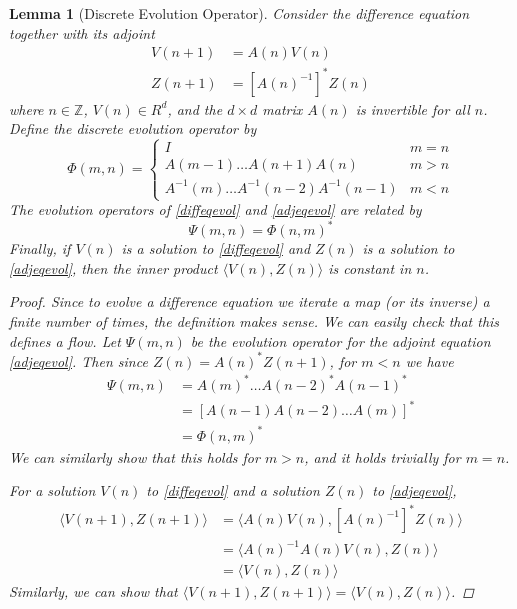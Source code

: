 \documentclass[12pt]{article}
\def\Z{{\mathbb Z}}
\newtheorem{lemma}{Lemma}
\begin{document}
\begin{lemma}[Discrete Evolution Operator]\label{evolop}
Consider the difference equation together with its adjoint
\begin{align}
V(n+1) &= A(n) V(n) \label{diffeqevol} \\
Z(n+1) &= [A(n)^{-1}]^* Z(n) \label{adjeqevol}
\end{align}
where $n \in \Z$, $V(n) \in R^d$, and the $d \times d$ matrix $A(n)$ is invertible for all $n$. Define the discrete evolution operator by
\begin{equation}\label{evol}
\Phi(m, n) = 
\begin{cases}
I & m = n \\
A(m-1) \dots A(n+1) A(n) & m > n \\
A^{-1}(m) \dots A^{-1}(n-2) A^{-1}(n-1) & m < n
\end{cases}
\end{equation}
The evolution operators of \eqref{diffeqevol} and \eqref{adjeqevol} are related by
\begin{equation}\label{adjevol}
\Psi(m, n) = \Phi(n, m)^*
\end{equation}
Finally, if $V(n)$ is a solution to \eqref{diffeqevol} and $Z(n)$ is a solution to \eqref{adjeqevol}, then the inner product $\langle V(n), Z(n) \rangle$ is constant in $n$.

\begin{proof}
Since to evolve a difference equation we iterate a map (or its inverse) a finite number of times, the definition makes sense. We can easily check that this defines a flow. Let $\Psi(m, n)$ be the evolution operator for the adjoint equation \eqref{adjeqevol}. Then since $Z(n) = A(n)^* Z(n+1)$, for $m < n$ we have
\begin{align*}
\Psi(m, n) &= A(m)^* \dots A(n-2)^* A(n-1)^* \\
&= [A(n-1) A(n-2) \dots A(m)]^* \\
&= \Phi(n, m)^*
\end{align*}
We can similarly show that this holds for $m > n$, and it holds trivially for $m = n$.

For a solution $V(n)$ to \eqref{diffeqevol} and a solution $Z(n)$ to \eqref{adjeqevol},
\begin{align*}
\langle V(n+1), Z(n+1) \rangle &= 
\langle A(n) V(n), [A(n)^{-1}]^* Z(n) \rangle \\
&= \langle A(n)^{-1} A(n) V(n), Z(n) \rangle \\
&= \langle V(n), Z(n) \rangle
\end{align*}
Similarly, we can show that $\langle V(n+1), Z(n+1) \rangle = \langle V(n), Z(n) \rangle$.
\end{proof}
\end{lemma}
\end{document}
